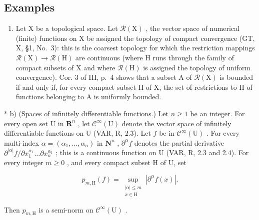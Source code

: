 \subsection{Examples}

\begin{enumerate}
\def\labelenumi{\alph{enumi})}
\tightlist
\item
  Let X be a topological space. Let \(\mathcal{R}(\mathrm{X})\) , the vector space of numerical (finite) functions on X be assigned the topology of compact convergence (GT, X, §1, No.~3): this is the coarsest topology for which the restriction mappings \(\mathcal{R}(\mathrm{X}) \to \mathcal{R}(\mathrm{H})\) are continuous (where H runs through the family of compact subsets of X and where \(\mathcal{R}(\mathrm{H})\) is assigned the topology of uniform convergence). Cor. 3 of III, p.~4 shows that a subset A of \(\mathcal{R}(\mathrm{X})\) is bounded if and only if, for every compact subset H of X, the set of restrictions to H of functions belonging to A is uniformly bounded.
\end{enumerate}

* b) (Spaces of infinitely differentiable functions.) Let \(n \geqslant 1\) be an integer. For every open set U in \(\mathbf{R}^n\) , let \(\mathcal{C}^\infty(\mathrm{U})\) denote the vector space of infinitely differentiable functions on U (VAR, R, 2.3). Let \(f\) be in \(\mathcal{C}^\infty(\mathrm{U})\) . For every multi-index \(\alpha = (\alpha_1, \dots, \alpha_n)\) in \(\mathbf{N}^n\) , \(\partial^\alpha f\) denotes the partial derivative \(\partial^{|\alpha|} f / \partial x_1^{\alpha_1} \dots \partial x_n^{\alpha_1}\) ; this is a continuous function on U (VAR, R, 2.3 and 2.4). For every integer \(m \geqslant 0\) , and every compact subset H of U, set

\[
p_{m,\mathrm{H}}(f) = \sup_{\substack{|\alpha |\leqslant m\\ x\in \mathrm{H}}}\left|\partial^{\alpha}f(x)\right|.\tag{1}
\]

Then \(p_{m,\mathrm{H}}\) is a semi-norm on \(\mathcal{C}^{\infty}(\mathrm{U})\) .

